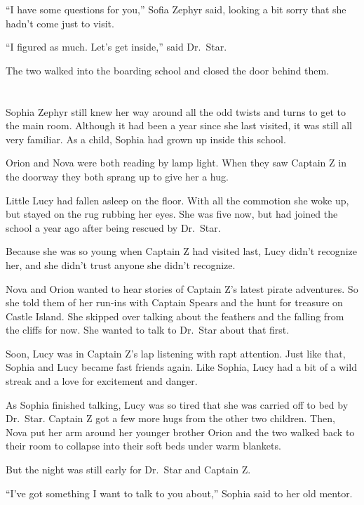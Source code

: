 \documentclass[12pt]{extbook}
\begin{document}
  \enquote{I have some questions for you,} Sofia Zephyr said, looking a
  bit sorry that she hadn't come just to visit.
  
  \enquote{I figured as much. Let's get inside,} said Dr.~Star.
  
  The two walked into the boarding school and closed the door behind them.
  
  \section{}\label{section-26}
  
  Sophia Zephyr still knew her way around all the odd twists and turns to
  get to the main room. Although it had been a year since she last
  visited, it was still all very familiar. As a child, Sophia had grown up
  inside this school.
  
  Orion and Nova were both reading by lamp light. When they saw Captain Z
  in the doorway they both sprang up to give her a hug.
  
  Little Lucy had fallen asleep on the floor. With all the commotion she
  woke up, but stayed on the rug rubbing her eyes. She was five now, but
  had joined the school a year ago after being rescued by Dr.~Star.
  
  Because she was so young when Captain Z had visited last, Lucy didn't
  recognize her, and she didn't trust anyone she didn't recognize.
  
  Nova and Orion wanted to hear stories of Captain Z's latest pirate
  adventures. So she told them of her run-ins with Captain Spears and the
  hunt for treasure on Castle Island. She skipped over talking about the
  feathers and the falling from the cliffs for now. She wanted to talk to
  Dr.~Star about that first.
  
  Soon, Lucy was in Captain Z's lap listening with rapt attention. Just
  like that, Sophia and Lucy became fast friends again. Like Sophia, Lucy
  had a bit of a wild streak and a love for excitement and danger.
  
  As Sophia finished talking, Lucy was so tired that she was carried off
  to bed by Dr.~Star. Captain Z got a few more hugs from the other two
  children. Then, Nova put her arm around her younger brother Orion and
  the two walked back to their room to collapse into their soft beds under
  warm blankets.
  
  But the night was still early for Dr.~Star and Captain Z.
  
  \enquote{I've got something I want to talk to you about,} Sophia said to
  her old mentor.
  
\end{document}
